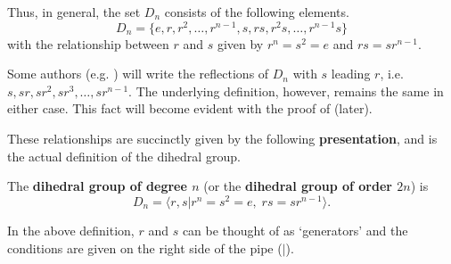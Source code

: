 Thus, in general, the set $D_n$ consists of the following elements.
\[
    D_n = \{e, r, r^2, \dots, r^{n-1}, s, rs, r^2s, \dots, r^{n-1}s\}
\]
with the relationship between $r$ and $s$ given by $r^n = s^2 = e$ and $rs = sr^{n-1}$.

\begin{remark}
    Some authors (e.g. {\cite[p.~25]{dummit_foote_2004}}) will write the reflections of $D_n$ with $s$ leading $r$, i.e. $s, sr, sr^2, sr^3, \dots, sr^{n-1}$. The underlying definition, however, remains the same in either case. This fact will become evident with the proof of  (later).
\end{remark}

These relationships are succinctly given by the following \textbf{presentation}, and is the actual definition of the dihedral group.
\begin{definition}
    The \textbf{dihedral group of degree $n$} (or the \textbf{dihedral group of order $2n$}) is
    \[
        D_n = \langle r, s \vert r^n = s^2 = e,\;rs = sr^{n-1} \rangle.
    \]
\end{definition}
\begin{remark}
    In the above definition, $r$ and $s$ can be thought of as `generators' and the conditions are given on the right side of the pipe ($|$).
\end{remark}

